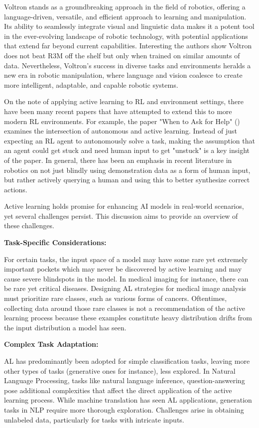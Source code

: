 \documentclass[
  letterpaper,
  numbers=noenddot,
  DIV=11]{scrreprt}
\theoremstyle{definition}
\theoremstyle{plain}
\theoremstyle{plain}
\theoremstyle{remark}
\begin{document}
Voltron stands as a groundbreaking approach in the field of robotics,
offering a language-driven, versatile, and efficient approach to
learning and manipulation. Its ability to seamlessly integrate visual
and linguistic data makes it a potent tool in the ever-evolving
landscape of robotic technology, with potential applications that extend
far beyond current capabilities. Interesting the authors show Voltron
does not beat R3M off the shelf but only when trained on similar amounts
of data. Nevertheless, Voltron's success in diverse tasks and
environments heralds a new era in robotic manipulation, where language
and vision coalesce to create more intelligent, adaptable, and capable
robotic systems.

On the note of applying active learning to RL and environment settings,
there have been many recent papers that have attempted to extend this to
more modern RL environments. For example, the paper "When to Ask for
Help" () examines the
intersection of autonomous and active learning. Instead of just
expecting an RL agent to autonomously solve a task, making the
assumption that an agent could get stuck and need human input to get
"unstuck" is a key insight of the paper. In general, there has been an
emphasis in recent literature in robotics on not just blindly using
demonstration data as a form of human input, but rather actively
querying a human and using this to better synthesize correct actions.

Active learning holds promise for enhancing AI models in real-world
scenarios, yet several challenges persist. This discussion aims to
provide an overview of these challenges.

\textbf{Task-Specific Considerations:}

For certain tasks, the input space of a model may have some rare yet
extremely important pockets which may never be discovered by active
learning and may cause severe blindspots in the model. In medical
imaging for instance, there can be rare yet critical diseases. Designing
AL strategies for medical image analysis must prioritize rare classes,
such as various forms of cancers. Oftentimes, collecting data around
those rare classes is not a recommendation of the active learning
process because these examples constitute heavy distribution drifts from
the input distribution a model has seen.

\textbf{Complex Task Adaptation:}

AL has predominantly been adopted for simple classification tasks,
leaving more other types of tasks (generative ones for instance), less
explored. In Natural Language Processing, tasks like natural language
inference, question-answering pose additional complexities that affect
the direct application of the active learning process. While machine
translation has seen AL applications, generation tasks in NLP require
more thorough exploration. Challenges arise in obtaining unlabeled data,
particularly for tasks with intricate inputs.
\end{document}
